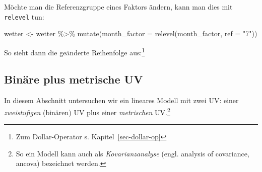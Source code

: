 \documentclass[
  a4paper,
]{scrbook}
\newenvironment{Shaded}{\begin{snugshade}}{\end{snugshade}}
\newcommand{\AttributeTok}[1]{\textcolor[rgb]{0.40,0.45,0.13}{#1}}
\newcommand{\DocumentationTok}[1]{\textcolor[rgb]{0.37,0.37,0.37}{\textit{#1}}}
\newcommand{\FunctionTok}[1]{\textcolor[rgb]{0.28,0.35,0.67}{#1}}
\newcommand{\NormalTok}[1]{\textcolor[rgb]{0.00,0.23,0.31}{#1}}
\newcommand{\OtherTok}[1]{\textcolor[rgb]{0.00,0.23,0.31}{#1}}
\newcommand{\SpecialCharTok}[1]{\textcolor[rgb]{0.37,0.37,0.37}{#1}}
\newcommand{\StringTok}[1]{\textcolor[rgb]{0.13,0.47,0.30}{#1}}
\theoremstyle{definition}
\theoremstyle{definition}
\theoremstyle{definition}
\theoremstyle{remark}
\begin{document}
Möchte man die Referenzgruppe eines Faktors ändern, kann man dies mit
\texttt{relevel} tun:

\begin{Shaded}
\begin{Highlighting}[]
\NormalTok{wetter }\OtherTok{\textless{}{-}}
\NormalTok{  wetter }\SpecialCharTok{\%\textgreater{}\%} 
  \FunctionTok{mutate}\NormalTok{(}\AttributeTok{month\_factor =} \FunctionTok{relevel}\NormalTok{(month\_factor, }\AttributeTok{ref =} \StringTok{"7"}\NormalTok{))}
\end{Highlighting}
\end{Shaded}

So sieht dann die geänderte Reihenfolge aus:\footnote{Zum
  Dollar-Operator s. Kapitel~\ref{sec-dollar-op}}

\begin{Shaded}
\end{Shaded}

\subsection{Binäre plus metrische UV}\label{sec-faktorvar}

In diesem Abschnitt untersuchen wir ein lineares Modell mit zwei UV:
einer \emph{zweistufigen} (binären) UV plus einer \emph{metrischen}
UV.\footnote{So ein Modell kann auch als \emph{Kovarianzanalyse} (engl.
  analysis of covariance, ancova) bezeichnet werden.}
\end{document}
